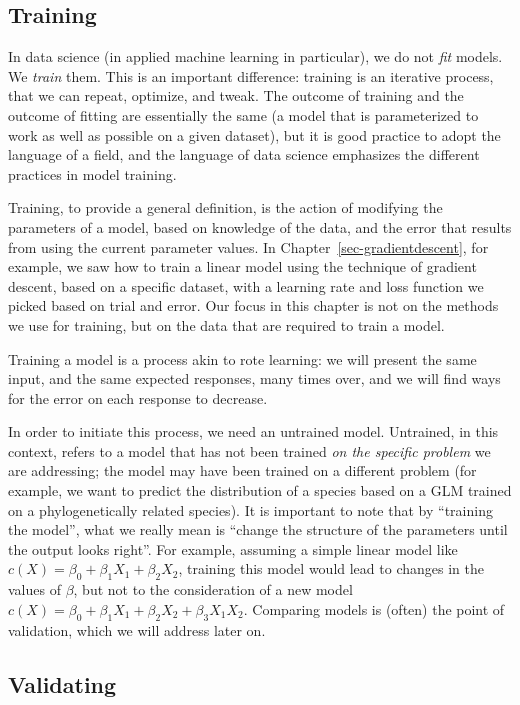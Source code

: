 \documentclass[
  letterpaper,
]{scrbook}
\begin{document}
\subsection{Training}\label{training}

In data science (in applied machine learning in particular), we do not
\emph{fit} models. We \emph{train} them. This is an important
difference: training is an iterative process, that we can repeat,
optimize, and tweak. The outcome of training and the outcome of fitting
are essentially the same (a model that is parameterized to work as well
as possible on a given dataset), but it is good practice to adopt the
language of a field, and the language of data science emphasizes the
different practices in model training.

Training, to provide a general definition, is the action of modifying
the parameters of a model, based on knowledge of the data, and the error
that results from using the current parameter values. In
Chapter~\ref{sec-gradientdescent}, for example, we saw how to train a
linear model using the technique of gradient descent, based on a
specific dataset, with a learning rate and loss function we picked based
on trial and error. Our focus in this chapter is not on the methods we
use for training, but on the data that are required to train a model.

Training a model is a process akin to rote learning: we will present the
same input, and the same expected responses, many times over, and we
will find ways for the error on each response to decrease.

In order to initiate this process, we need an untrained model.
Untrained, in this context, refers to a model that has not been trained
\emph{on the specific problem} we are addressing; the model may have
been trained on a different problem (for example, we want to predict the
distribution of a species based on a GLM trained on a phylogenetically
related species). It is important to note that by ``training the
model'', what we really mean is ``change the structure of the parameters
until the output looks right''. For example, assuming a simple linear
model like \(c(X) = \beta_0 + \beta_1X_1 + \beta_2X_2\), training this
model would lead to changes in the values of \(\beta\), but not to the
consideration of a new model
\(c(X) = \beta_0 + \beta_1X_1 + \beta_2X_2 + \beta_3X_1X_2\). Comparing
models is (often) the point of validation, which we will address later
on.

\subsection{Validating}\label{validating}
\end{document}
